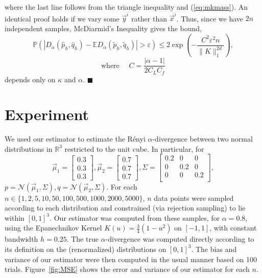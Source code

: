 \documentclass{article}
\renewcommand{\qed}{\quad \ensuremath{\blacksquare}}    %
\newcommand{\R}{\mathbb{R}}                         %
\newcommand{\e}{\varepsilon}                        %
\newcommand{\E}{\mathbb{E}}                         %
\newcommand{\pr}{\mathbb{P}}                        %
\newcommand{\cpest}{\widehat{p}_h}                  %
\newcommand{\cqest}{\widehat{q}_h}                  %
\newcommand{\pest}{\widetilde{p}_h}                 %
\newcommand{\qest}{\widetilde{q}_h}                 %
\newcommand{\vx}{\vec{x}}                           %
\newcommand{\vy}{\vec{y}}                           %
\begin{document}
where the last line follows from the triangle inequality and (\ref{eq:mkmass}).
An identical proof holds if we vary some $\vy^i$ rather than $\vx^i$. Thus,
since we have $2n$ independent samples, McDiarmid's Inequality gives the bound,
\[ \pr \left( |D_\alpha(\cpest,\cqest) - \E D_\alpha(\pest,\qest)| > \e \right)
   \leq 2\exp \left(
            -\frac{C^2\e^2n}{\|K\|_1^{2d}}
        \right),
\]
\begin{equation}
\label{ineq:var_consts}
\mbox{where } \quad
  C = \frac{|\alpha - 1|}{2C_LC_f}
\end{equation}
depends only on $\kappa$ and $\alpha$. \qed

\section{Experiment} \label{sec:numerical}
We used our estimator to estimate the R\'enyi $\alpha$-divergence between two
normal distributions in $\R^3$ restricted to the unit cube. In particular, for
\[
\vec{\mu}_1 = \begin{bmatrix}
0.3 \\
0.3 \\
0.3
\end{bmatrix},
\vec{\mu}_2 = \begin{bmatrix}
0.7 \\
0.7 \\
0.7
\end{bmatrix},
\Sigma = \begin{bmatrix}
0.2 & 0   & 0   \\
0   & 0.2 & 0   \\
0   & 0   & 0.2 \\
\end{bmatrix},
\]
$p = \mathcal{N}(\vec{\mu}_1,\Sigma),q = \mathcal{N}(\vec{\mu}_2,\Sigma)$.
For each $n \in \{1,2,5,10,50,100,500,1000,2000,5000\}$, $n$ data points were
sampled according to each distribution and constrained (via rejection sampling)
to lie within $[0,1]^3$. Our estimator was computed from these samples, for
$\alpha = 0.8$, using the Epanechnikov Kernel $K(u) = \frac{3}{4} (1 - u^2)$
on $[-1,1]$, with constant bandwidth $h = 0.25$. The true $\alpha$-divergence
was computed directly according to its definition on the (renormalized)
distributions on $[0,1]^3$. The bias and variance of our estimator were then
computed in the usual manner based on 100 trials. Figure~\ref{fig:MSE} shows
the error and variance of our estimator for each $n$.
\end{document}
